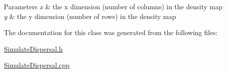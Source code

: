 \begin{DoxyParams}{Parameters}
{\em x} & the x dimension (number of columns) in the density map \\
\hline
{\em y} & the y dimension (number of rows) in the density map \\
\hline
\end{DoxyParams}


The documentation for this class was generated from the following files\+:\begin{DoxyCompactItemize}
\item 
\hyperlink{_simulate_dispersal_8h}{Simulate\+Dispersal.\+h}\item 
\hyperlink{_simulate_dispersal_8cpp}{Simulate\+Dispersal.\+cpp}\end{DoxyCompactItemize}

